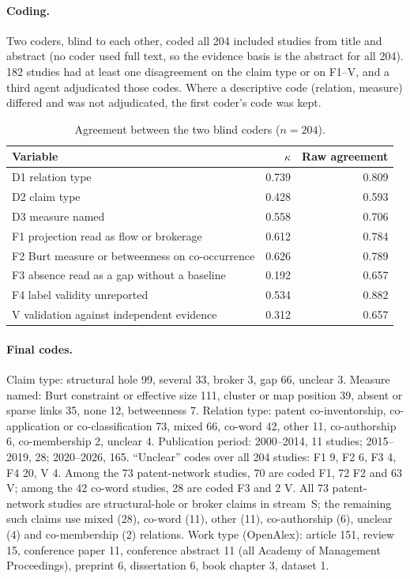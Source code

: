 \paragraph{Coding.} Two coders, blind to each other, coded all 204 included studies from title and abstract (no coder used full text, so the evidence basis is the abstract for all 204). 182 studies had at least one disagreement on the claim type or on F1--V, and a third agent adjudicated those codes. Where a descriptive code (relation, measure) differed and was not adjudicated, the first coder's code was kept.

\begin{table}[htbp]
  \centering
  \caption{Agreement between the two blind coders ($n = 204$).}
  \label{tab:app_review_kappa}
  \small
  \begin{tabular}{lrr}
    \toprule
    Variable & $\kappa$ & Raw agreement \\
    \midrule
    D1 relation type & 0.739 & 0.809 \\
    D2 claim type & 0.428 & 0.593 \\
    D3 measure named & 0.558 & 0.706 \\
    F1 projection read as flow or brokerage & 0.612 & 0.784 \\
    F2 Burt measure or betweenness on co-occurrence & 0.626 & 0.789 \\
    F3 absence read as a gap without a baseline & 0.192 & 0.657 \\
    F4 label validity unreported & 0.534 & 0.882 \\
    V validation against independent evidence & 0.312 & 0.657 \\
    \bottomrule
  \end{tabular}
\end{table}

\paragraph{Final codes.} Claim type: structural hole 99, several 33, broker 3, gap 66, unclear 3. Measure named: Burt constraint or effective size 111, cluster or map position 39, absent or sparse links 35, none 12, betweenness 7. Relation type: patent co-inventorship, co-application or co-classification 73, mixed 66, co-word 42, other 11, co-authorship 6, co-membership 2, unclear 4. Publication period: 2000--2014, 11 studies; 2015--2019, 28; 2020--2026, 165. ``Unclear'' codes over all 204 studies: F1 9, F2 6, F3 4, F4 20, V 4. Among the 73 patent-network studies, 70 are coded F1, 72 F2 and 63 V; among the 42 co-word studies, 28 are coded F3 and 2 V. All 73 patent-network studies are structural-hole or broker claims in stream~S; the remaining such claims use mixed (28), co-word (11), other (11), co-authorship (6), unclear (4) and co-membership (2) relations. Work type (OpenAlex): article 151, review 15, conference paper 11, conference abstract 11 (all Academy of Management Proceedings), preprint 6, dissertation 6, book chapter 3, dataset 1.

